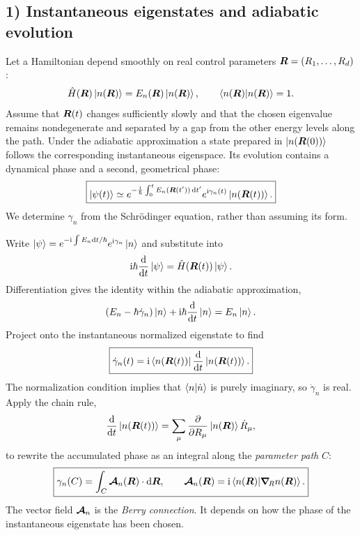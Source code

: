 \subsection*{1) Instantaneous eigenstates and adiabatic evolution}

Let a Hamiltonian depend smoothly on real control parameters $\bm{R}=(R_1,\ldots,R_d)$:
\begin{equation}
\hat{H}(\bm{R})\left|n(\bm{R})\right\rangle=E_n(\bm{R})\left|n(\bm{R})\right\rangle,\qquad
\left\langle n(\bm{R})\middle|n(\bm{R})\right\rangle=1.
\end{equation}
Assume that $\bm{R}(t)$ changes sufficiently slowly and that the chosen eigenvalue remains nondegenerate and separated by a gap from the other energy levels along the path. Under the adiabatic approximation a state prepared in $\left|n(\bm{R}(0))\right\rangle$ follows the corresponding instantaneous eigenspace. Its evolution contains a dynamical phase and a second, geometrical phase:
\begin{equation}
\boxed{\left|\psi(t)\right\rangle\simeq
 e^{-\frac{\mathrm{i}}\hbar\int_0^t E_n(\bm{R}(t'))\,\mathrm{d} t'}
 e^{\mathrm{i}\gamma_n(t)}\left|n(\bm{R}(t))\right\rangle.}
\end{equation}
We determine $\gamma_n$ from the Schr\"odinger equation, rather than assuming its form.

Write $\left|\psi\right\rangle=e^{-\mathrm{i}\int E_n\mathrm{d} t/\hbar}e^{\mathrm{i}\gamma_n}\left|n\right\rangle$ and substitute into
\begin{equation}
\mathrm{i}\hbar\frac{\mathrm{d}}{\mathrm{d} t}\left|\psi\right\rangle=\hat{H}(\bm{R}(t))\left|\psi\right\rangle.
\end{equation}
Differentiation gives the identity within the adiabatic approximation,
\begin{equation}
\left(E_n-\hbar\dot\gamma_n\right)\left|n\right\rangle
   +\mathrm{i}\hbar\frac{\mathrm{d}}{\mathrm{d} t}\left|n\right\rangle=E_n\left|n\right\rangle.
\end{equation}
Project onto the instantaneous normalized eigenstate to find
\begin{equation}
\boxed{\dot\gamma_n(t)=\mathrm{i}\left\langle n(\bm{R}(t))\right|
\frac{\mathrm{d}}{\mathrm{d} t}\left|n(\bm{R}(t))\right\rangle.}
\end{equation}
The normalization condition implies that $\left\langle n\middle|\dot n\right\rangle$ is purely imaginary, so $\dot\gamma_n$ is real. Apply the chain rule,
\begin{equation}
\frac{\mathrm{d}}{\mathrm{d} t}\left|n(\bm{R}(t))\right\rangle
 =\sum_\mu\frac{\partial}{\partial R_\mu}\left|n(\bm{R})\right\rangle\dot R_\mu,
\end{equation}
to rewrite the accumulated phase as an integral along the \emph{parameter path} $C$:
\begin{equation}
\boxed{\gamma_n(C)=\int_C\bm{\mathcal A}_n(\bm{R})\cdot\mathrm{d}\bm{R},
\qquad\bm{\mathcal A}_n(\bm{R})
 =\mathrm{i}\left\langle n(\bm{R})\middle|\bm{\nabla}_{\!R}n(\bm{R})\right\rangle.}
\end{equation}
The vector field $\bm{\mathcal A}_n$ is the \emph{Berry connection}. It depends on how the phase of the instantaneous eigenstate has been chosen.

